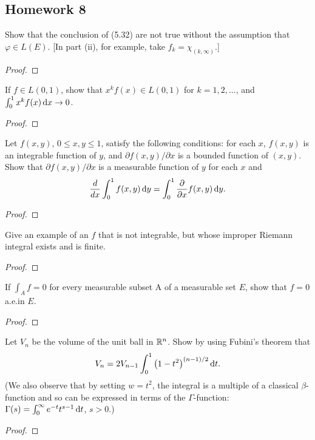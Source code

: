 \subsection{Homework 8}
\begin{problem}
Show that the conclusion of (5.32) are not true without the assumption that
$\varphi\in L(E)$. [In part (ii), for example, take $f_k=\chi_{(k,\infty)}$.]
\end{problem}
\begin{proof}
\end{proof}

\begin{problem}
If $f\in L(0,1)$, show that $x^kf(x)\in L(0,1)$ for $k=1,2,...$, and
$\int_0^1 x^kf(x)\mathop{}\!\mathrm{d} x\to 0$.
\end{problem}
\begin{proof}
\end{proof}

\begin{problem}
Let $f(x,y)$, $0\leq x,y\leq 1$, satisfy the following conditions: for each
$x$, $f(x,y)$ is an integrable function of $y$, and
$\partial f(x,y)/\partial x$ is a bounded function of $(x,y)$. Show that
$\partial f(x,y)/\partial x$ is a measurable function of $y$ for each $x$
and
\[
\frac{d}{dx}\int_0^1f(x,y)\mathop{}\!\mathrm{d} y=\int_0^1\frac{\partial}{\partial x}f(x,y)\mathop{}\!\mathrm{d} y.
\]
\end{problem}
\begin{proof}
\end{proof}

\begin{problem}
Give an example of an $f$ that is not integrable, but whose improper
Riemann integral exists and is finite.
\end{problem}
\begin{proof}
\end{proof}

\begin{problem}
If $\int_A f=0$ for every measurable subset A of a measurable set $E$, show
that $f=0$ a.e.\@ in $E$.
\end{problem}
\begin{proof}
\end{proof}

\begin{problem}
 Let $V_n$ be the volume of the unit ball in $\mathbb{R}^n$. Show by using
 Fubini's theorem that
\[
V_n=2V_{n-1}\int_0^1\left(1-t^2\right)^{(n-1)/2}\mathop{}\!\mathrm{d} t.
\]
(We also observe that by setting $w=t^2$, the integral is a multiple of a
classical $\beta$-function and so can be expressed in terms of the
$\Gamma$-function: $\Gamma(s)=\int_0^\infty e^{-t}t^{s-1}\mathop{}\!\mathrm{d} t$, $s>0$.)
\end{problem}
\begin{proof}
\end{proof}

